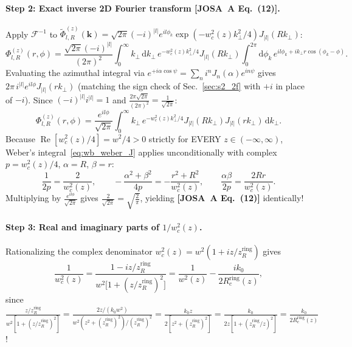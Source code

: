 \documentclass[10pt,letterpaper]{article}
\newcommand{\abs}[1]{\lvert #1 \rvert}
\newcommand{\dd}{\mathrm{d}}
\newcommand{\josa}[1]{\textbf{[JOSA~A Eq.~(#1)]}}
\numberwithin{equation}{section}
\begin{document}
\paragraph*{Step 2: Exact inverse 2D Fourier transform \josa{12}.}
Apply $\mathcal{F}^{-1}$ to $\widetilde{\Phi}_{l,R}^{(z)}(\mathbf{k}) = \sqrt{2\pi}(-i)^{\abs{l}} e^{il\phi_k}\allowbreak\exp(-w_c^2(z)k_\perp^2/4) J_{\abs{l}}(R k_\perp)$:
\begin{equation}
  \Phi_{l,R}^{(z)}(r,\phi) = \frac{\sqrt{2\pi}(-i)^{\abs{l}}}{(2\pi)^2}\int_0^\infty k_\perp\,\dd k_\perp\, e^{-w_c^2(z)k_\perp^2/4} J_{\abs{l}}(Rk_\perp)\int_0^{2\pi} \dd\phi_k\, e^{il\phi_k + i k_\perp r\cos(\phi_k-\phi)}.
\end{equation}
Evaluating the azimuthal integral via $e^{+i\alpha\cos\psi} = \sum_n i^n J_n(\alpha) e^{in\psi}$ gives $2\pi\,i^{\abs{l}} e^{il\phi} J_{\abs{l}}(r k_\perp)$ (matching the sign check of Sec.~\ref{sec:s2_2f} with $+i$ in place of $-i$). Since $(-i)^{\abs{l}} i^{\abs{l}} = 1$ and $\frac{2\pi\sqrt{2\pi}}{(2\pi)^2} = \frac{1}{\sqrt{2\pi}}$:
\begin{equation}
  \Phi_{l,R}^{(z)}(r,\phi) = \frac{e^{il\phi}}{\sqrt{2\pi}}\int_0^\infty k_\perp\,e^{-w_c^2(z)k_\perp^2/4} J_{\abs{l}}(Rk_\perp) J_{\abs{l}}(rk_\perp)\,\dd k_\perp.
\end{equation}
Because $\operatorname{Re}[w_c^2(z)/4] = w^2/4 > 0$ strictly for EVERY $z \in (-\infty,\infty)$, Weber's integral~\eqref{eq:wb_weber_J} applies unconditionally with complex $p = w_c^2(z)/4$, $\alpha = R$, $\beta = r$:
\begin{equation}
  \frac{1}{2p} = \frac{2}{w_c^2(z)}, \qquad -\frac{\alpha^2+\beta^2}{4p} = -\frac{r^2+R^2}{w_c^2(z)}, \qquad \frac{\alpha\beta}{2p} = \frac{2Rr}{w_c^2(z)}.
\end{equation}
Multiplying by $\frac{e^{il\phi}}{\sqrt{2\pi}}$ gives $\frac{2}{\sqrt{2\pi}} = \sqrt{\frac{2}{\pi}}$, yielding \josa{12} identically!

\paragraph*{Step 3: Real and imaginary parts of $1/w_c^2(z)$.}
Rationalizing the complex denominator $w_c^2(z) = w^2(1 + i z/z_R^{\mathrm{ring}})$ gives
\begin{equation}
  \frac{1}{w_c^2(z)} = \frac{1 - i z/z_R^{\mathrm{ring}}}{w^2\bigl[1 + (z/z_R^{\mathrm{ring}})^2\bigr]} = \frac{1}{w^2(z)} - \frac{i k_0}{2 R_c^{\mathrm{ring}}(z)},
\end{equation}
since $\frac{z/z_R^{\mathrm{ring}}}{w^2[1+(z/z_R^{\mathrm{ring}})^2]} = \frac{2z/(k_0 w^2)}{w^2(z^2+(z_R^{\mathrm{ring}})^2)/(z_R^{\mathrm{ring}})^2} = \frac{k_0 z}{2[z^2 + (z_R^{\mathrm{ring}})^2]} = \frac{k_0}{2 z[1+(z_R^{\mathrm{ring}}/z)^2]} = \frac{k_0}{2 R_c^{\mathrm{ring}}(z)}$!
\end{document}
